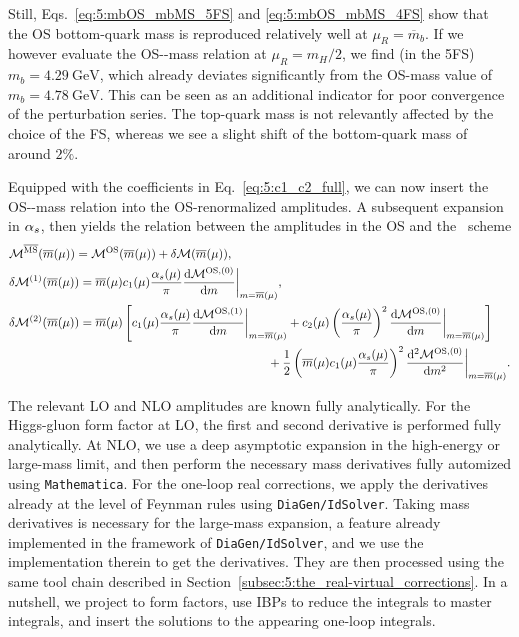 Still, Eqs.~\eqref{eq:5:mbOS_mbMS_5FS} and \eqref{eq:5:mbOS_mbMS_4FS} show that the \acs{OS} bottom-quark mass is reproduced relatively well at $\mu_R = \overline{m}_b$. If we however evaluate the \acs{OS}-\MS-mass relation at $\mu_R = m_H/2$, we find (in the 5\acs{FS}) $m_b = 4.29 \ \mathrm{GeV}$, which already deviates significantly from the \acs{OS}-mass value of $m_b = 4.78\ \mathrm{GeV}$. This can be seen as an additional indicator for poor convergence of the perturbation series. The top-quark mass is not relevantly affected by the choice of the \acs{FS}, whereas we see a slight shift of the bottom-quark mass of around $2\%$.

Equipped with the coefficients in Eq.~\eqref{eq:5:c1_c2_full}, we can now insert the \acs{OS}-\MS-mass relation into the \acs{OS}-renormalized amplitudes. A subsequent expansion in $\alpha_s$, then yields the relation between the amplitudes in the \acs{OS} and the \MS\ scheme
\begin{equation}
\begin{split}
  & \mathcal{M}^{\overline{\text{MS}}}(\overline{m}(\mu)) = \mathcal{M}^{\text{OS}}(\overline{m}(\mu)) + \delta \mathcal{M} (\overline{m}(\mu)), \\
  & \delta \mathcal{M}^{(1)} (\overline{m}(\mu)) = \overline{m}(\mu)c_1(\mu) \frac{\alpha_s(\mu)}{\pi}\frac{\mathrm{d} \mathcal{M}^{\text{OS},(0)}}{\mathrm{d} m} \bigg \vert_{m = \overline{m}(\mu)} , \\
  & \delta \mathcal{M}^{(2)} (\overline{m}(\mu)) = \overline{m}(\mu) \left[ c_1(\mu) \frac{\alpha_s(\mu)}{\pi} \frac{\mathrm{d} \mathcal{M}^{\text{OS},(1)}}{\mathrm{d} m}\bigg \vert_{m = \overline{m}(\mu)}  + c_2(\mu) \left(\frac{\alpha_s(\mu)}{\pi}\right)^2 \frac{\mathrm{d}\mathcal{M}^{\text{OS},(0)}}{\mathrm{d}m}\bigg \vert_{m = \overline{m}(\mu)}  \right] \\
  & \hspace{7.5cm}+ \frac{1}{2}\left(\overline{m}(\mu) c_1(\mu) \frac{\alpha_s(\mu)}{\pi} \right)^2 \frac{\mathrm{d}^2 \mathcal{M}^{\text{OS},(0)}}{\mathrm{d} m^2} \bigg \vert_{m = \overline{m}(\mu)} .
\end{split}
\label{eq:5:MMS_to_MOS}
\end{equation}

The relevant \acs{LO} and \acs{NLO} amplitudes are known fully analytically. For the Higgs-gluon form factor at \acs{LO}, the first and second derivative is performed fully analytically. At \acs{NLO}, we use a deep asymptotic expansion in the high-energy or large-mass limit,  and then perform the necessary mass derivatives fully automized using \texttt{Mathematica}. For the one-loop real corrections, we apply the derivatives already at the level of Feynman rules using \texttt{DiaGen/IdSolver}. Taking mass derivatives is necessary for the large-mass expansion, a feature already implemented in the framework of \texttt{DiaGen/IdSolver}, and we use the implementation therein to get the derivatives. They are then processed using the same tool chain described in Section~\ref{subsec:5:the_real-virtual_corrections}. In a nutshell, we project to form factors, use \acs{IBP}s to reduce the integrals to master integrals, and insert the solutions to the appearing one-loop integrals.


